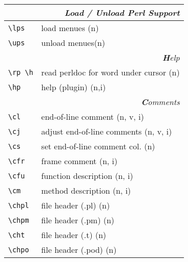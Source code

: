 \documentclass[oneside,10pt,landscape,DIV17]{scrartcl}
\begin{document}
\begin{multicols}{3}
\begin{center}
\begin{tabular}[]{|p{11mm}|p{58mm}|}
\hline
\multicolumn{2}{|r|}{\textsl{\textbf{L}oad / \textbf{U}nload Perl Support}}\\[1.0ex]
\hline \verb'\lps'  & load menues  \hfill (n) \\
\hline \verb'\ups'  & unload menues\hfill (n) \\
\hline
\hline 
\multicolumn{2}{|r|}{\textsl{\textbf{H}elp}}    \\[1.0ex]
\hline \verb'\rp \h' & read perldoc for word under cursor       \hfill (n)   \\
\hline \verb'\hp'   & help (plugin) \hfill (n,i)\\
\hline 
\hline
\multicolumn{2}{|r|}{\textsl{\textbf{C}omments}}                       \\[1.0ex]
\hline \verb'\cl'   & end-of-line comment               \hfill (n, v, i)\\
\hline \verb'\cj'   & adjust end-of-line comments       \hfill (n, v, i)\\
\hline \verb'\cs'   & set end-of-line comment col.      \hfill (n)      \\
\hline \verb'\cfr'  & frame comment                     \hfill (n, i)   \\
\hline \verb'\cfu'  & function description              \hfill (n, i)   \\
\hline \verb'\cm'   & method description                \hfill (n, i)   \\
\hline \verb'\chpl' & file header (.pl)                 \hfill (n)      \\
\hline \verb'\chpm' & file header (.pm)                 \hfill (n)      \\
\hline \verb'\cht'  & file header (.t)                  \hfill (n)      \\
\hline \verb'\chpo' & file header (.pod)                \hfill (n)      \\

\end{tabular}
\end{center}
\end{multicols}
\end{document}
